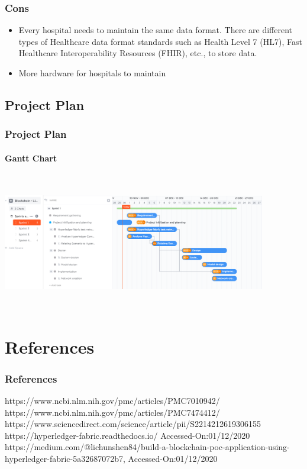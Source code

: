 \documentclass[english,hangout]{beamer}
\begin{document}
\begin{frame}[fragile]
 \frametitle{Cons}
    \begin{itemize}
        \item Every hospital needs to maintain the same data format. There are different types of Healthcare data format standards such as Health Level 7 (HL7), Fast Healthcare Interoperability Resources (FHIR), etc., to store data.
        \item More hardware for hospitals to maintain
    \end{itemize}
\end{frame}

\subsection{Project Plan}

\begin{frame}[fragile]
 \frametitle{Project Plan}
 \framesubtitle{Gantt Chart}
    \begin{center}
        \vspace{-1.2em}
            \includegraphics[height=6cm, width=11.5cm]{BC_Project_Plan.png}
        \end{center}
        \vspace{-3mm}
\end{frame}



\section{References}

\begin{frame}
\frametitle{References}
\begin{thebibliography}{00}
 https://www.ncbi.nlm.nih.gov/pmc/articles/PMC7010942/
 https://www.ncbi.nlm.nih.gov/pmc/articles/PMC7474412/
 https://www.sciencedirect.com/science/article/pii/S2214212619306155
 https://hyperledger-fabric.readthedocs.io/ Accessed-On:01/12/2020
 https://medium.com/@lichunshen84/build-a-blockchain-poc-application-using-hyperledger-fabric-5a32687072b7, Accessed-On:01/12/2020
\end{thebibliography}

\end{frame}
\end{document}
